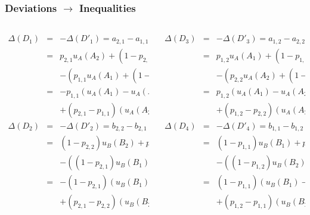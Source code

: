 \documentclass[xcolor=dvipsnames,envcountsect]{beamer}
\begin{document}
\begin{frame}
\frametitle{Deviations $\rightarrow$ Inequalities}
\begin{columns}
\begin{column}[t]{6cm}
\begin{scriptsize}
\begin{eqnarray*}
	\Delta(D_1) &=& -\Delta(D'_1) = a_{2,1}-a_{1,1}\\
	&=&p_{2,1}u_A(A_2)+(1-p_{2,1})u_A(B_1)\\
	&&-(p_{1,1}u_A(A_1)+(1-p_{1,1})u_A(B_1))\\
	&=& -p_{1,1}(u_A(A_1)-u_A(A_2))\\ 
	&&+ (p_{2,1}-p_{1,1})(u_A(A_2)-u_A(B_1)).
\end{eqnarray*}
\begin{eqnarray*}
	\Delta(D_2) &=& -\Delta(D'_2) = b_{2,2}-b_{2,1}\\
	&=&(1-p_{2,2})u_B(B_2)+p_{2,2}u_B(A_2)\\ 
	&&- ((1-p_{2,1})u_B(B_1)+p_{2,1}u_B(A_2))\\
	&=& -(1-p_{2,1})(u_B(B_1)-u_B(B_2))\\
	&&+(p_{2,1}-p_{2,2})(u_B(B_2) - u_B(A_2)).
\end{eqnarray*}
\end{scriptsize}
\end{column}
\begin{column}[t]{6cm}
\begin{scriptsize}
\begin{eqnarray*}
	\Delta(D_3) &=& -\Delta(D'_3) = a_{1,2}-a_{2,2}\\ &=&p_{1,2}u_A(A_1)+(1-p_{1,2})u_A(B_2)\\
	&&-(p_{2,2}u_A(A_2)+(1-p_{2,2})u_A(B_2))\\
	&=& p_{1,2}(u_A(A_1)-u_A(A_2))\\ 
	&&+ (p_{1,2}-p_{2,2})(u_A(A_2)-u_A(B_2)).
\end{eqnarray*}
\begin{eqnarray*}
	\Delta(D_4) &=& -\Delta(D'_4) = b_{1,1}-b_{1,2}\\ &=&(1-p_{1,1})u_B(B_1)+p_{1,1}u_B(A_1)\\ 
	&&- ((1-p_{1,2})u_B(B_2)+p_{1,2}u_B(A_1))\\
	&=& (1-p_{1,1})(u_B(B_1)-u_B(B_2))\\
	&&+(p_{1,2}-p_{1,1})(u_B(B_2) - u_B(A_1)).
\end{eqnarray*}
\end{scriptsize}
\end{column}
\end{columns}
\end{frame}
\end{document}
